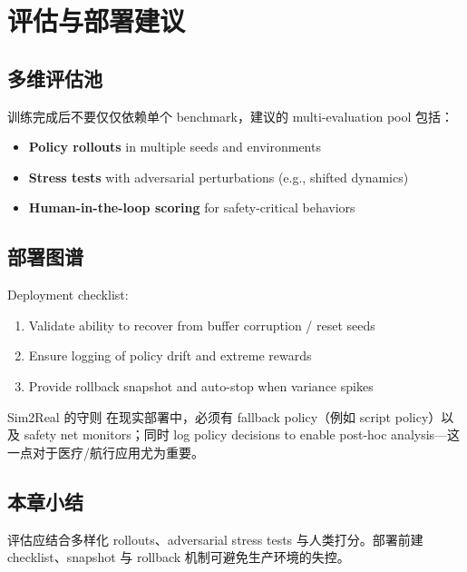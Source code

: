 \section{评估与部署建议}

\subsection{多维评估池}

训练完成后不要仅仅依赖单个 benchmark，建议的 multi-evaluation pool 包括：

\begin{itemize}
    \item \textbf{Policy rollouts} in multiple seeds and environments
    \item \textbf{Stress tests} with adversarial perturbations (e.g., shifted dynamics)
    \item \textbf{Human-in-the-loop scoring} for safety-critical behaviors
\end{itemize}

\subsection{部署图谱}

Deployment checklist:

\begin{enumerate}
    \item Validate ability to recover from buffer corruption / reset seeds
    \item Ensure logging of policy drift and extreme rewards
    \item Provide rollback snapshot and auto-stop when variance spikes
\end{enumerate}

\begin{importantbox}{Sim2Real 的守则}
在现实部署中，必须有 fallback policy（例如 script policy）以及 safety net monitors；同时 log policy decisions to enable post-hoc analysis—这一点对于医疗/航行应用尤为重要。
\end{importantbox}

\subsection{本章小结}

评估应结合多样化 rollouts、adversarial stress tests 与人类打分。部署前建 checklist、snapshot 与 rollback 机制可避免生产环境的失控。

